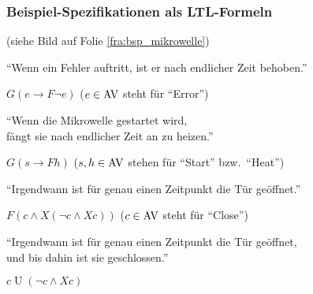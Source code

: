     \begin{frame}
      \frametitle{Beispiel-Spezifikationen als LTL-Formeln}
      
       {\footnotesize (siehe Bild auf Folie \ref{fra:bsp_mikrowelle})}
      \begin{Itemize}
        \item%
          "`Wenn ein Fehler auftritt, ist er nach endlicher Zeit behoben."'
          \par\smallskip
          $G(e \to F \neg e)$ \hfill {\footnotesize ($e \in \textup{AV}$ steht für "`Error"')}
          \par\smallskip
        \item<2->%
          "`Wenn die Mikrowelle gestartet wird, \\
          fängt sie nach endlicher Zeit an zu heizen."'
          \par\smallskip
          $G(s \to F h)$ \hfill {\footnotesize ($s,h \in \textup{AV}$ stehen für "`Start"' bzw.\ "`Heat"')}
          \par\smallskip
        \item<3->
          "`Irgendwann ist für genau einen Zeitpunkt die Tür geöffnet."'
          \par\smallskip
          $F(c \land X(\neg c \land Xc))$ \hfill {\footnotesize ($c \in \textup{AV}$ steht für "`Close"')}
          \par\smallskip
        \item<4->
          "`Irgendwann ist für genau einen Zeitpunkt die Tür geöffnet,\\
          und bis dahin ist sie geschlossen."'
          \par\smallskip
          $c\mathbin{U}(\neg c \land Xc)$
      \end{Itemize}

\end{frame}
